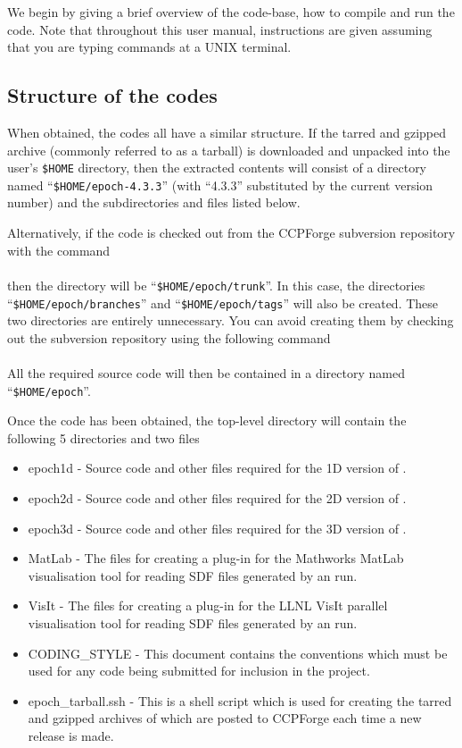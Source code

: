 We begin by giving a brief overview of the {\EPOCH} code-base, how to
compile and run the code. Note that throughout this user manual, instructions
are given assuming that you are typing commands at a UNIX terminal.

\subsection{Structure of the {\EPOCH} codes}
\label{sec:directory_structure}
When obtained, the {\EPOCH} codes all have a similar structure. If the tarred
and gzipped archive (commonly referred to as a tarball) is downloaded and
unpacked into the user's \verb|$HOME| directory, then the extracted contents
will consist of a directory named ``\verb|$HOME/epoch-4.3.3|''
(with ``4.3.3'' substituted by the current version number) and the
subdirectories and files listed below.

Alternatively, if the code is checked out from the CCPForge subversion
repository with the command\\
\indent{}\\
\noindent%
then the directory will be ``\verb|$HOME/epoch/trunk|''. In this case, the
directories ``\verb|$HOME/epoch/branches|'' and ``\verb|$HOME/epoch/tags|''
will also be created. These two directories are entirely unnecessary. You
can avoid creating them by checking out the subversion repository using the
following command\\
\indent{}\\
\noindent%
All the required source code will then be contained in a directory named
``\verb|$HOME/epoch|''.

Once the code has been obtained, the top-level directory will contain the
following 5 directories and two files
\begin{itemize}
\item epoch1d - Source code and other files required for the 1D version of
  {\EPOCH}.
\item epoch2d - Source code and other files required for the 2D version of
  {\EPOCH}.
\item epoch3d - Source code and other files required for the 3D version of
  {\EPOCH}.
\item MatLab - The files for creating a plug-in for the Mathworks MatLab
  visualisation tool for reading SDF files generated by an {\EPOCH} run.
\item VisIt - The files for creating a plug-in for the LLNL VisIt parallel
  visualisation tool for reading SDF files generated by an {\EPOCH} run.
\item CODING\_STYLE - This document contains the conventions which must be
  used for any code being submitted for inclusion in the {\EPOCH} project.
\item epoch\_tarball.ssh - This is a shell script which is used for creating
  the tarred and gzipped archives of {\EPOCH} which are posted to CCPForge
  each time a new release is made.
\end{itemize}

